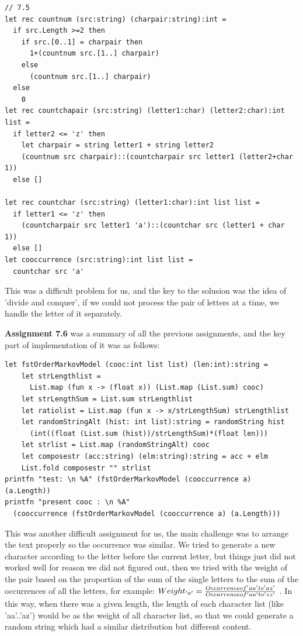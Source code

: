 \documentclass{article}
\begin{document}
\begin{lstlisting}
// 7.5
let rec countnum (src:string) (charpair:string):int =
  if src.Length >=2 then
    if src.[0..1] = charpair then
      1+(countnum src.[1..] charpair)
    else
      (countnum src.[1..] charpair)
  else
    0
let rec countchapair (src:string) (letter1:char) (letter2:char):int list =
  if letter2 <= 'z' then
    let charpair = string letter1 + string letter2
    (countnum src charpair)::(countcharpair src letter1 (letter2+char 1))
  else []

let rec countchar (src:string) (letter1:char):int list list = 
  if letter1 <= 'z' then
    (countcharpair src letter1 'a')::(countchar src (letter1 + char 1))
  else []
let cooccurrence (src:string):int list list =
  countchar src 'a'
\end{lstlisting}

This was a difficult problem for us, and the key to the solusion was the idea of 'divide and conquer', if we could not process the pair of letters at a time, we handle the letter of it separately.

\textbf{Assignment 7.6} was a summary of all the previous assignments, and the key part of implementation of it was as follows:
\begin{lstlisting}
let fstOrderMarkovModel (cooc:int list list) (len:int):string =
    let strLengthlist = 
      List.map (fun x -> (float x)) (List.map (List.sum) cooc)
    let strLengthSum = List.sum strLengthlist
    let ratiolist = List.map (fun x -> x/strLengthSum) strLengthlist
    let randomStringAlt (hist: int list):string = randomString hist 
      (int((float (List.sum (hist))/strLengthSum)*(float len)))
    let strlist = List.map (randomStringAlt) cooc
    let composestr (acc:string) (elm:string):string = acc + elm
    List.fold composestr "" strlist
printfn "test: \n %A" (fstOrderMarkovModel (cooccurrence a) (a.Length))
printfn "present cooc : \n %A" 
  (cooccurrence (fstOrderMarkovModel (cooccurrence a) (a.Length)))
\end{lstlisting}

This was another difficult assignment for us, the main challenge was to arrange the text properly so the occurrence was similar. We tried to generate a new character according to the letter before the current letter, but things just did not worked well for reason we did not figured out, then we tried with the weight of the pair based on the proportion of the sum of the single letters to the sum of the occurrences of all the letters, for example:
\begin{math}
$$Weight_{'a'} = \frac{Occurrence of 'aa' to 'az'}{Occurrence of 'aa' to 'zz'}$$
\end{math}
. In this way, when there was a given length, the length of each character list (like 'aa'..'az') would be as the weight of all character list, so that we could generate a random string which had a similar distribution but different content.
\end{document}

